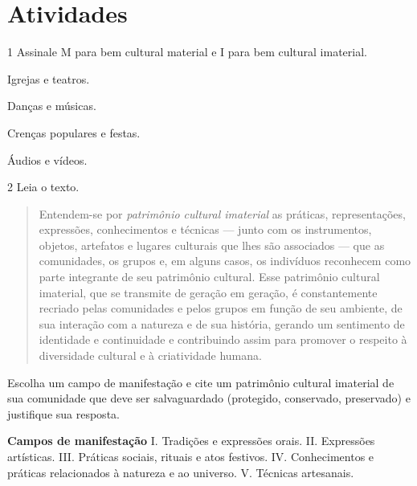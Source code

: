 \section{Atividades}

\num{1} Assinale M para bem cultural material e I para bem cultural imaterial.

\begin{boxlist}
\item Igrejas e teatros. 

\item Danças e músicas. 

\item Crenças populares e festas. 

\item Áudios e vídeos. 
\end{boxlist}

\num{2}  Leia o texto.

\begin{quote}
Entendem-se por \emph{patrimônio cultural imaterial} as práticas,
representações, expressões, conhecimentos e técnicas --- junto com os
instrumentos, objetos, artefatos e lugares culturais que lhes são
associados --- que as comunidades, os grupos e, em alguns casos, os
indivíduos reconhecem como parte integrante de seu patrimônio cultural.
Esse patrimônio cultural imaterial, que se transmite de geração em
geração, é constantemente recriado pelas comunidades e pelos grupos em função
de seu ambiente, de sua interação com a natureza e de sua história,
gerando um sentimento de identidade e continuidade e contribuindo assim
para promover o respeito à diversidade cultural e à criatividade humana.

\end{quote}

Escolha um campo de manifestação e cite um patrimônio cultural imaterial
de sua comunidade que deve ser salvaguardado (protegido, conservado,
preservado) e justifique sua resposta.

\textbf{Campos de manifestação}
I. Tradições e expressões orais.
II. Expressões artísticas.
III. Práticas sociais, rituais e atos festivos.
IV. Conhecimentos e práticas relacionados à natureza e ao universo.
V. Técnicas artesanais.


